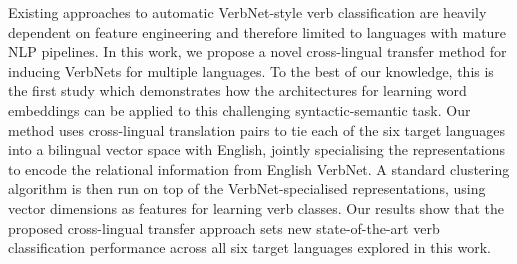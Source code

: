 Existing approaches to automatic VerbNet-style verb classification are heavily dependent on feature engineering and therefore limited to languages with mature NLP pipelines. In this work, we propose a novel cross-lingual transfer method for inducing VerbNets for multiple languages. To the best of our knowledge, this is the first study which demonstrates how the architectures for learning word embeddings can be applied to this challenging syntactic-semantic task. Our method uses cross-lingual translation pairs to tie each of the six target languages into a bilingual vector space with English, jointly specialising the representations to encode the relational information from English VerbNet. A standard clustering algorithm is then run on top of the VerbNet-specialised representations, using vector dimensions as features for learning verb classes. Our results show that the proposed cross-lingual transfer approach sets new state-of-the-art verb classification performance across all six target languages explored in this work.
